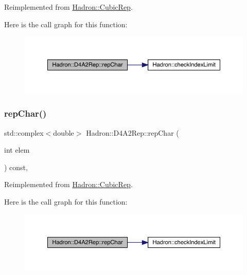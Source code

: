 Reimplemented from \mbox{\hyperlink{structHadron_1_1CubicRep_af45227106e8e715e84b0af69cd3b36f8}{Hadron\+::\+Cubic\+Rep}}.

Here is the call graph for this function\+:
\nopagebreak
\begin{figure}[H]
\begin{center}
\leavevmode
\includegraphics[width=350pt]{d7/d66/structHadron_1_1D4A2Rep_ac408f55785ba08ce215277bb1cb4a006_cgraph}
\end{center}
\end{figure}
\mbox{\label{structHadron_1_1D4A2Rep_ac408f55785ba08ce215277bb1cb4a006}} 
\subsubsection{\texorpdfstring{repChar()}{repChar()}\hspace{0.1cm}{\footnotesize\ttfamily [3/3]}}
{\footnotesize\ttfamily std\+::complex$<$double$>$ Hadron\+::\+D4\+A2\+Rep\+::rep\+Char (\begin{DoxyParamCaption}\item[{int}]{elem }\end{DoxyParamCaption}) const\hspace{0.3cm}{\ttfamily [inline]}, {\ttfamily [virtual]}}



Reimplemented from \mbox{\hyperlink{structHadron_1_1CubicRep_af45227106e8e715e84b0af69cd3b36f8}{Hadron\+::\+Cubic\+Rep}}.

Here is the call graph for this function\+:
\nopagebreak
\begin{figure}[H]
\begin{center}
\leavevmode
\includegraphics[width=350pt]{d7/d66/structHadron_1_1D4A2Rep_ac408f55785ba08ce215277bb1cb4a006_cgraph}
\end{center}
\end{figure}
\mbox{\label{structHadron_1_1D4A2Rep_a278dadc5305417dfc7dd7a8e1ae642d4}} 
